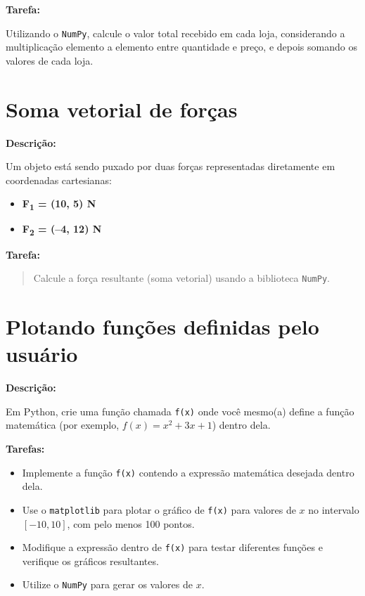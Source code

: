 \textbf{Tarefa:}

Utilizando o \texttt{NumPy}, calcule o valor total recebido em cada loja, considerando a multiplicação elemento a elemento entre quantidade e preço, e depois somando os valores de cada loja.


\section{Soma vetorial de forças}

\textbf{Descrição:}  

Um objeto está sendo puxado por duas forças representadas diretamente em coordenadas cartesianas:

\begin{itemize}
    \item \textbf{F\textsubscript{1} = (10, 5) N}
    \item \textbf{F\textsubscript{2} = (–4, 12) N}
\end{itemize}

\textbf{Tarefa:}

\begin{quote}
Calcule a força resultante (soma vetorial) usando a biblioteca \texttt{NumPy}.
\end{quote}


\section{Plotando funções definidas pelo usuário}

\textbf{Descrição:}  

Em Python, crie uma função chamada \texttt{f(x)} onde você mesmo(a) define a função matemática (por exemplo, \(f(x) = x^2 + 3x + 1\)) dentro dela.

\textbf{Tarefas:}

\begin{itemize}
    \item Implemente a função \texttt{f(x)} contendo a expressão matemática desejada dentro dela.
    \item Use o \texttt{matplotlib} para plotar o gráfico de \texttt{f(x)} para valores de \(x\) no intervalo \([-10, 10]\), com pelo menos 100 pontos.
    \item Modifique a expressão dentro de \texttt{f(x)} para testar diferentes funções e verifique os gráficos resultantes.
    \item Utilize o \texttt{NumPy} para gerar os valores de \(x\).
\end{itemize}


